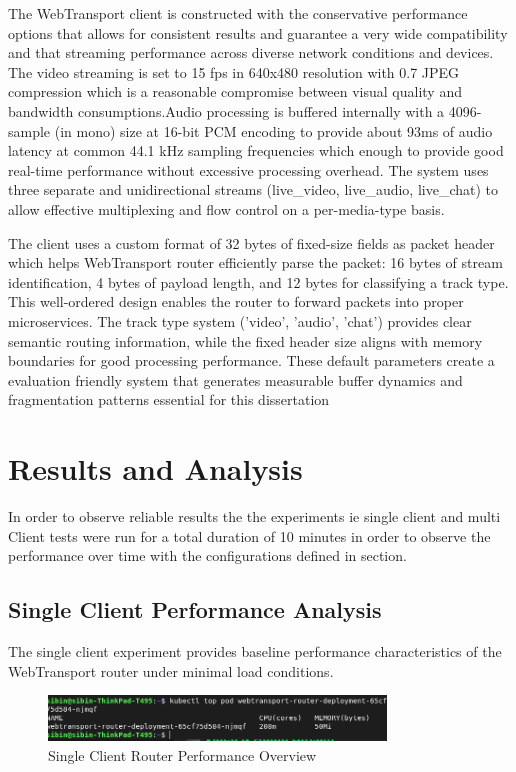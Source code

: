The WebTransport client is constructed with the conservative performance options that allows for consistent results and guarantee a very wide compatibility and that streaming performance across diverse network conditions and devices. The video streaming is set to 15 fps in 640x480 resolution with 0.7 JPEG compression which is a reasonable compromise between visual quality and bandwidth consumptions.Audio processing is buffered internally with a 4096-sample (in mono) size at 16-bit PCM encoding to provide about 93ms of audio latency at common 44.1 kHz sampling frequencies which enough to provide good real-time performance without excessive processing overhead. The system uses three separate and unidirectional streams (live\_video, live\_audio, live\_chat) to allow effective multiplexing and flow control on a per-media-type basis.

The client uses a custom format of 32 bytes of fixed-size fields as packet header which helps WebTransport router efficiently parse the packet: 16 bytes of stream identification, 4 bytes of payload length, and 12 bytes for classifying a track type. This well-ordered design enables the router to forward packets into proper microservices. The track type system ('video', 'audio', 'chat') provides clear semantic routing information, while the fixed header size aligns with memory boundaries for good processing performance. These default parameters create a evaluation friendly system that generates measurable buffer dynamics and fragmentation patterns essential for this dissertation

\section{Results and Analysis}
In order to observe reliable results the the experiments ie single client and multi Client tests were run for a total duration of 10 minutes in order to observe the performance over time with the configurations defined in section.

\subsection{Single Client Performance Analysis}

The single client experiment provides baseline performance characteristics of the WebTransport router under minimal load conditions.
\begin{figure}[h!]
\centering
\includegraphics[width=0.8\textwidth]{Evaluation/new-single-client-stats.png}
\caption{Single Client Router Performance Overview}
\label{fig:single-client-overview}
\end{figure}

